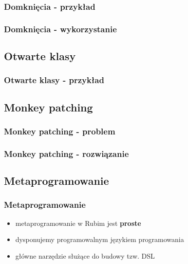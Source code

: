 \documentclass[12t]{beamer}
\begin{document}
\begin{frame}
  \frametitle{Domknięcia - przykład}
  
\end{frame}

\begin{frame}
  \frametitle{Domknięcia - wykorzystanie}
  
\end{frame}

\subsection{Otwarte klasy}
\begin{frame}
  \frametitle{Otwarte klasy - przykład}
  
\end{frame}

\subsection{Monkey patching}
\begin{frame}
  \frametitle{Monkey patching - problem}
  
\end{frame}

\begin{frame}
  \frametitle{Monkey patching - rozwiązanie}
  
\end{frame}

\subsection{Metaprogramowanie}
\begin{frame}
  \frametitle{Metaprogramowanie}
  \begin{itemize}
  \item metaprogramowanie w Rubim jest \textbf{proste}
  \item dysponujemy programowalnym językiem programowania
  \item główne narzędzie służące do budowy tzw. DSL
  \end{itemize}
\end{frame}
\end{document}
